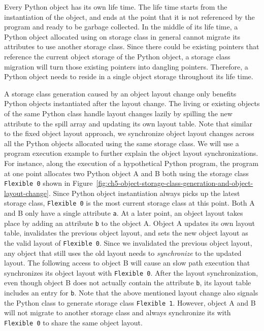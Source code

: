 Every Python object has its own life time.
The life time starts from the instantiation of the object, and ends at the point that it is not referenced by the program and ready to be garbage collected.
In the middle of its life time, a Python object allocated using on storage class in general cannot migrate its attributes to use another storage class.
Since there could be existing pointers that reference the current object storage of the Python object, a storage class migration will turn those existing pointers into dangling pointers.
Therefore, a Python object needs to reside in a single object storage throughout its life time.

A storage class generation caused by an object layout change only benefits Python objects instantiated after the layout change.
The living or existing objects of the same Python class handle layout changes lazily by spilling the new attribute to the spill array and updating its own layout table.
Note that similar to the fixed object layout approach, we synchronize object layout changes across all the Python objects allocated using the same storage class.
We will use a program execution example to further explain the object layout synchronizations.
For instance, along the execution of a hypothetical Python program, the program at one point allocates two Python object \textsf{A} and \textsf{B} both using the storage class \texttt{Flexible 0} shown in Figure~\ref{fig:ch5-object-storage-class-generation-and-object-layout-change}.
Since Python object instantiation always picks up the latest storage class, \texttt{Flexible 0} is the most current storage class at this point.
Both \textsf{A} and \textsf{B} only have a single attribute \texttt{a}.
At a later point, an object layout takes place by adding an attribute \texttt{b} to the object \textsf{A}.
Object \textsf{A} updates its own layout table, invalidates the previous object layout, and sets the new object layout as the valid layout of \texttt{Flexible 0}.
Since we invalidated the previous object layout, any object that still uses the old layout needs to \emph{synchronize} to the updated layout.
The following access to object \textsf{B} will cause an slow path execution that synchronizes its object layout with \texttt{Flexible 0}.
After the layout synchronization, even though object \textsf{B} does not actually contain the attribute \texttt{b}, its layout table includes an entry for \texttt{b}.
Note that the above mentioned layout change also signals the Python class to generate storage class \texttt{Flexible 1}.
However, object \textsf{A} and \textsf{B} will not migrate to another storage class and always synchronize its with \texttt{Flexible 0} to share the same object layout.

